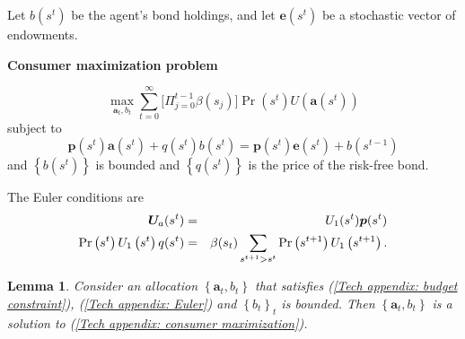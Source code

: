 \documentclass[thmsb,11pt]{article}
\newtheorem{lemma}{Lemma}
\begin{document}
Let $b(s^{t})$ be the agent's bond holdings, and let $\bm{e}\left(
s^{t}\right) $ be a stochastic vector of endowments.

\textbf{Consumer maximization problem}


\begin{equation}
\max_{\bm{a}_{t},b_{t}}\sum_{t=0}^{\infty }\bigl[\Pi_{j=0}^{t-1} \beta(s_j)\bigr]\Pr \left(
s^{t}\right) U(\bm{a}\left( s^{t}\right) )
\label{Tech appendix: consumer maximization}
\end{equation}%
subject to%
\begin{equation}
\bm{p}\left( s^{t}\right) \bm{a}\left( s^{t}\right) +q(s^{t})b\left(
s^{t}\right) =\bm{p}\left( s^{t}\right) \bm{e}\left( s^{t}\right)
+b\left( s^{t-1}\right)  \label{Tech appendix: budget constraint}
\end{equation}%
and $\left \{ b\left( s^{t}\right) \right \} $ is bounded and $\left \{
q(s^{t})\right \} $ is the price of the risk-free bond.

The Euler conditions are%
\begin{eqnarray}
\bm{U}_{a}(s^{t}) &=&U_{1}(s^{t})\bm{p}(s^{t})
\label{Tech appendix: Euler} \\
\Pr \left( s^{t}\right) U_{1}\left( s^{t}\right) q(s^{t}) &=&\beta(s_t)
\sum_{s^{t+1}>s^{t}}\Pr \left( s^{t+1}\right) U_{1}\left( s^{t+1}\right) .
\notag
\end{eqnarray}

\begin{lemma}
\smallskip Consider an allocation $\left \{ \bm{a}_{t},b_{t}\right \} $
that satisfies (\ref{Tech appendix: budget constraint}), (\ref{Tech
appendix: Euler}) and $\left \{ b_{t}\right \} _{t}$ is bounded. Then $%
\left
\{ \bm{a}_{t},b_{t}\right \} $ is a solution to (\ref{Tech
appendix: consumer maximization}).
\end{lemma}
\end{document}
